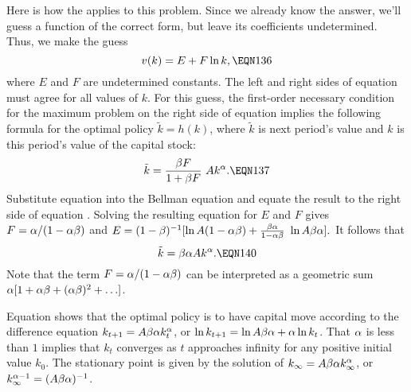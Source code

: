   Here is how the  applies to
this problem.  Since we already know the answer, we'll guess
a function of the correct form, but leave its coefficients
undetermined.  
Thus, we make the guess
$$v(k) =E+F\ln k,\EQN 136$$
where $E$ and $F$ are undetermined constants.
The left and right sides of equation  must agree for all values
of $k$.
For this guess, the first-order necessary condition for the
maximum problem on the right side of  equation  implies the
following formula for the optimal policy $\tilde k=h(k)$, where $\tilde k$ is
next period's value and $k$ is this period's value of the capital stock:
$$\tilde k={\be F\over 1+\be F} \ Ak^\a.\EQN 137$$
Substitute equation  into the  Bellman
equation and equate the result to the right side of  equation
.  Solving the
resulting equation for $E$ and $F$ gives $F=\alpha/(1-\alpha{\beta})$ and
$E=(1-{\beta})^{-1} [ \mathop{\hbox{ln}} A(1-\alpha{\beta})+ {{\beta}\alpha\over 1-\alpha{\beta}}\ \mathop{\hbox{ln}}
 A{\beta}\alpha ].$
It follows that
$$\tilde k=\be\a A k^\a.\EQN 140$$
Note that
the term $F=\alpha/(1-\alpha{\beta})$  can be interpreted as a
geometric sum $\alpha[1+\alpha{\beta}+(\alpha{\beta})^2+\ldots]$.

Equation  shows that the optimal policy is to have capital move
according to the difference equation $k_{{t+1}}=A{\beta}\alpha k_t^\alpha$, or
 $\mathop{\hbox{ln}} k_{{t+1}}=\mathop{\hbox{ln}} A{\beta}\alpha+
\alpha \mathop{\hbox{ln}} k_t$.  That $\alpha$ is less than $1$
 implies that $k_t$ converges as $t$ approaches infinity for
any positive initial value $k_0$.  The stationary point is given by the
solution of $k_\infty =A{\beta}\alpha k_\infty^\alpha$, or $k_\infty^{\alpha-1}=(A{\beta}\alpha)^{-1}$.

